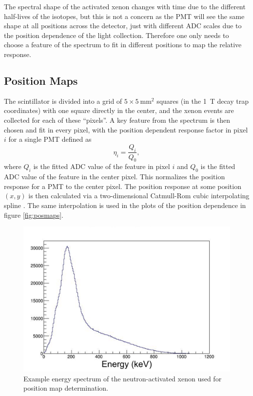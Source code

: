 The spectral shape of the activated xenon changes with time due to the different half-lives
of the isotopes, but this is not a concern as the PMT will see the same shape at all positions
across the detector, just with different ADC scales due to the position dependence of the light
collection. Therefore one only needs to choose a feature of the spectrum to fit in different
positions to map the relative response.

\subsection{Position Maps}

The scintillator is divided into a grid of $5\times5\mathrm{~mm}^2$ squares (in the 1~T
decay trap coordinates) with one square directly in the center,
and the xenon events are collected for each of these ``pixels''. A key feature
from the spectrum is then chosen and fit in every pixel, with the position dependent response
factor in pixel $i$ for a single PMT defined as
%
\begin{equation}
  \eta_i = \frac{Q_i}{Q_0},
\end{equation}
%
where $Q_i$ is the fitted ADC value of the feature in pixel $i$ and $Q_0$ is the fitted ADC value of the
feature in the center pixel. This normalizes the position response for a PMT to the center pixel. The
position response at some position $(x,y)$ is then calculated via a two-dimensional Catmull-Rom
cubic interpolating spline \cite{catmull1974}. The same interpolation is used in the plots of the
position dependence in figure \ref{fig:posmaps}.

\begin{figure}[h] 
\centering
\includegraphics[scale=.5]{3-UCNAAnalysis/xenonSpectrum.pdf}
\caption{Example energy spectrum of the neutron-activated xenon used for position map determination. }
\label{fig:xenonSpectrum}
\end{figure}

